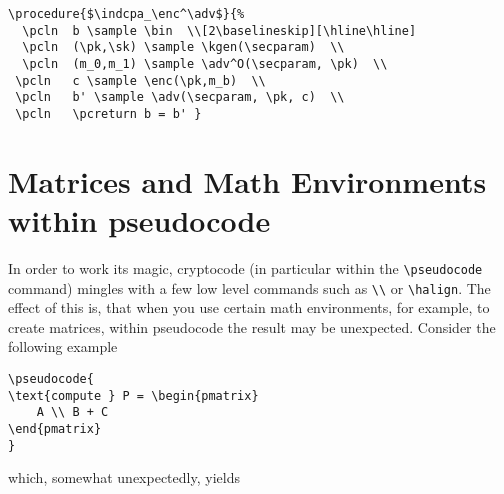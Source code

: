 \documentclass[a4paper]{report}
\begin{document}
\begin{center}
\end{center}

\begin{lstlisting}
\procedure{$\indcpa_\enc^\adv$}{%
  \pcln  b \sample \bin  \\[2\baselineskip][\hline\hline]
  \pcln  (\pk,\sk) \sample \kgen(\secparam)  \\
  \pcln  (m_0,m_1) \sample \adv^O(\secparam, \pk)  \\
 \pcln   c \sample \enc(\pk,m_b)  \\
 \pcln   b' \sample \adv(\secparam, \pk, c)  \\
 \pcln   \pcreturn b = b' }
\end{lstlisting}

\section{Matrices and Math Environments within pseudocode}

In order to work its magic, cryptocode (in particular within the \lstinline{\pseudocode} command) mingles with a few low level commands such as
\lstinline{\\} or \lstinline{\halign}. The effect of this is, that when you use certain math environments, for example, to create matrices, within pseudocode
the result may be unexpected. Consider the following example

\begin{lstlisting}
\pseudocode{
\text{compute } P = \begin{pmatrix}
    A \\ B + C
\end{pmatrix}
}
\end{lstlisting}

which, somewhat unexpectedly, yields

\begin{center}
\end{center}
\end{document}
